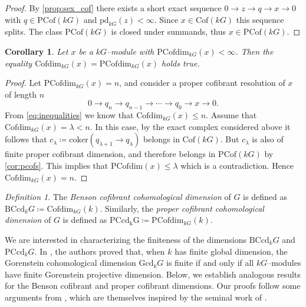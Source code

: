 \documentclass{amsart}
\numberwithin{equation}{section}%
\newtheorem{corollary}[equation]{Corollary}
\theoremstyle{remark}
\newtheorem{definition}[equation]{Definition}
\begin{document}
{\begin{proof}
By \cref{prop:sex_cof} there exists a short exact sequence $0\rightarrow z\rightarrow q\rightarrow x\rightarrow 0$ with $q\in\mathrm{PCof}(kG)$ and $\mathrm{pd}_{kG}(z)<\infty.$ Since $x\in\mathrm{Cof}(kG)$ this sequence splits. The class $\mathrm{PCof}(kG)$ is closed under summands, thus  $x\in\mathrm{PCof}(kG).$
\end{proof}


\begin{corollary}
\label{cor:refinement}
Let $x$ be a $kG$--module with $\mathrm{PCofdim}_{kG}(x)<\infty$. Then the equality $\mathrm{Cofdim}_{kG}(x)=\mathrm{PCofdim}_{kG}(x)$ holds true.
\end{corollary}

\begin{proof}
Let $\mathrm{PCofdim}_{kG}(x)=n$, and consider a proper cofibrant resolution of $x$ of length $n$ 
\[
0\rightarrow q_n\rightarrow q_{n-1}\rightarrow \cdots\rightarrow q_0\rightarrow x\rightarrow 0.
\]
From \cref{eq:inequalities} we know that $\mathrm{Cofdim}_{kG}(x)\leqslant n$.   Assume that $\mathrm{Cofdim}_{kG}(x)=\lambda<n$. In this case, by the exact complex considered above it follows that  $c_{\lambda}\coloneqq\mathrm{coker}(q_{\lambda+1}\rightarrow q_\lambda)$ belongs in $\mathrm{Cof}(kG).$ But $c_\lambda$ is also of finite proper cofibrant dimension, and therefore belongs in $\mathrm{PCof}(kG)$ by \cref{cor:pcofs}. This implies that $\mathrm{PCofdim}(x)\leqslant\lambda$ which is a contradiction. Hence $\mathrm{Cofdim}_{kG}(x)=n$.
\end{proof}

\begin{definition}\label{def-Bensondim}
The \textit{Benson cofibrant cohomological dimension} of $G$ is defined as $\mathrm{BCcd}_kG\coloneqq  \mathrm{Cofdim}_{kG}(k)$. Similarly, the \textit{proper cofibrant cohomological dimension} of $G$ is defined as $\mathrm{PCcd_{k}G\coloneq}\mathrm{PCofdim}_{kG}(k)$.
\end{definition}

We are interested in characterizing the finiteness of the dimensions $\mathrm{BCcd}_kG$ and $\mathrm{PCcd}_{k}G$. 
In \cite{em-t}, the authors proved that, when $k$ has finite  global dimension, the Gorenstein cohomological dimension $\mathrm{Gcd}_kG$ is finite if and only if all $kG$--modules have finite Gorenstein projective dimension. 
Below, we establish analogous results for the Benson cofibrant and proper cofibrant dimensions. Our proofs follow some arguments from \cite{em-t}, which are themselves inspired by the seminal work of \cite{CP}.



}
\end{document}
